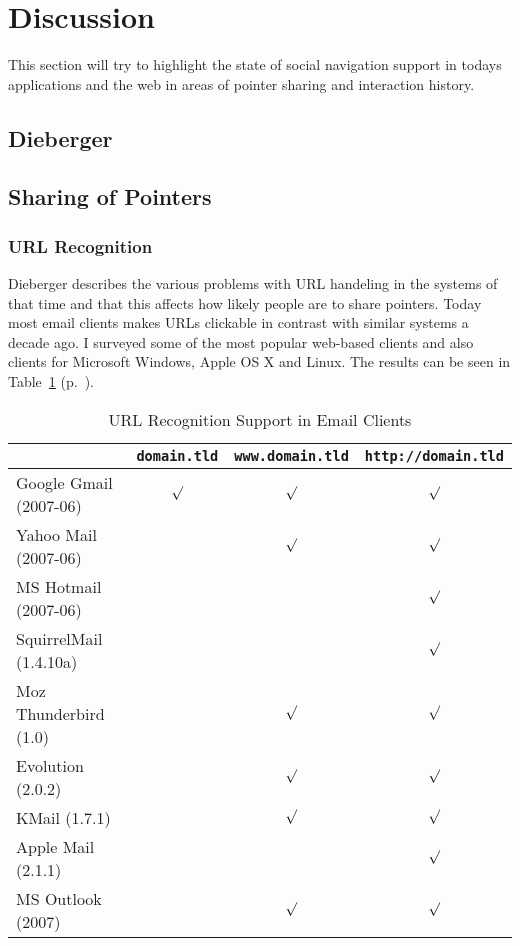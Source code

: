 \documentclass[12pt,a4paper]{article}
\begin{document}
\section{Discussion}

This section will try to highlight the state of social navigation support in
todays applications and the web in areas of pointer sharing and interaction
history.

\subsection{Dieberger}

\subsection{Sharing of Pointers}

\subsubsection{URL Recognition}

Dieberger describes the various problems with URL handeling in the systems of
that time and that this affects how likely people are to share pointers. Today
most email clients makes URLs clickable in contrast with similar systems a
decade ago. I surveyed some of the most popular web-based clients and also
clients for Microsoft Windows, Apple OS X and Linux. The results can be seen
in Table~\ref{table:email} (p.~\pageref{table:email}).

\begin{table}[h!b!p!]
  \caption{URL Recognition Support in Email Clients}
  \label{table:email}
  \begin{center}
    \begin{small}
      \begin{tabular}{l|ccc}
        \hline
        &
        \texttt{domain.tld} &
        \texttt{www.domain.tld} &
        \texttt{http://domain.tld} \\
        \hline
        \hline
        Google Gmail (2007-06) & $\surd$ & $\surd$ & $\surd$ \\
        Yahoo Mail (2007-06)   &         & $\surd$ & $\surd$ \\
        MS Hotmail (2007-06)   &         &         & $\surd$ \\
        SquirrelMail (1.4.10a) &         &         & $\surd$ \\
        Moz Thunderbird (1.0)  &         & $\surd$ & $\surd$ \\
        Evolution (2.0.2)      &         & $\surd$ & $\surd$ \\
        KMail (1.7.1)          &         & $\surd$ & $\surd$ \\
        Apple Mail (2.1.1)     &         &         & $\surd$ \\
        MS Outlook (2007)      &         & $\surd$ & $\surd$ \\
        \hline
      \end{tabular}
    \end{small}
  \end{center}
\end{table}
\end{document}
